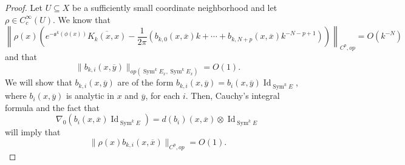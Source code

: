 \documentclass{amsart}
\theoremstyle{definition}
\theoremstyle{remark}
\numberwithin{equation}{section}
\DeclareMathOperator{\Sym}{Sym}
\DeclareMathOperator{\Id}{Id}
\begin{document}
\begin{proof}

Let $U \subseteq X$ be a sufficiently small coordinate neighborhood and let $\rho \in C_c^\infty(U)$. We know that
\begin{equation*}
\left \|\rho(x) \left ( e^{-\mathfrak{s}^k(\phi(x))} \overline{K_k(x,x)} - \frac{1}{2\pi} \left ( b_{k,0}(x,\overline{x})k + \dotsb + b_{k,N+p}(x,\overline{x}) k^{-N-p+1} \right) \right) \right \|_{C^p,op} = O(k^{-N})
\end{equation*}
and that
\begin{equation*}
    \|b_{k,i}(x,\overline{y})\|_{op(\Sym^k E_x,\Sym^k E_x)} = O(1).
\end{equation*}
We will show that $b_{k,i}(x,\overline{y})$ are of the form $b_{k,i}(x,\overline{y}) = b_i(x,\overline{y}) \Id_{\Sym^k E}$, where $b_i(x,\overline{y})$ is analytic in $x$ and $\overline{y}$, for each $i$. Then, Cauchy's integral formula and the fact that 
\begin{equation*}
    \nabla_0 (b_i(x,\overline{x}) \Id_{\Sym^k E}) = d (b_i)(x,\overline{x}) \otimes \Id_{\Sym^k E}
\end{equation*}
will imply that
\begin{equation*}
    \|\rho(x)b_{k,i}(x,\overline{x})\|_{C^p,op} = O(1).
\end{equation*}



\end{proof}
\end{document}
